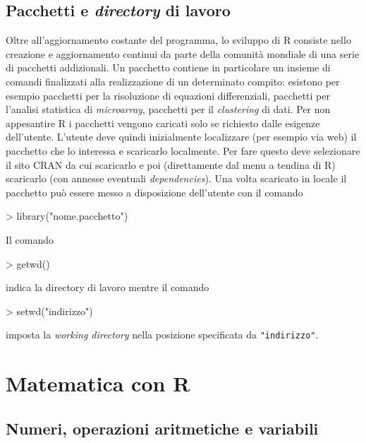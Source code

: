\documentclass[onecolumn,11pt]{book}
\begin{document}
\section*{Pacchetti e \emph{directory} di lavoro}
Oltre all'aggiornamento costante del programma, lo sviluppo di \textsf{R} consiste nello creazione e aggiornamento continui da parte della comunit\`a  mondiale di una serie di pacchetti addizionali. Un pacchetto contiene in particolare un insieme di comandi finalizzati alla  realizzazione di un determinato compito: esistono per esempio pacchetti per la risoluzione di equazioni differenziali, pacchetti per l'analisi statistica di {\it microarray}, pacchetti per il {\it clustering} di dati.  Per non appesantire \textsf{R} i pacchetti vengono caricati solo se richiesto dalle esigenze dell'utente. 
L'utente deve quindi inizialmente localizzare (per esempio via web) il pacchetto che lo interessa e scaricarlo localmente.  Per fare questo deve selezionare il sito CRAN da cui scaricarlo e poi (direttamente dal menu a tendina di \textsf{R}) scaricarlo (con annesse eventuali {\it dependencies}). Una volta scaricato in locale il pacchetto pu\`o essere messo a disposizione dell'utente con il comando  
\begin{Schunk}
\begin{Sinput}
> library("nome.pacchetto")
\end{Sinput}
\end{Schunk}
Il comando  
\begin{Schunk}
\begin{Sinput}
> getwd()
\end{Sinput}
\end{Schunk}
indica la directory di lavoro mentre il comando 
\begin{Schunk}
\begin{Sinput}
> setwd("indirizzo")
\end{Sinput}
\end{Schunk}
 imposta la {\it working directory}  nella posizione specificata da \texttt{"indirizzo"}.
\newpage
\thispagestyle{empty}
 \chapter{Matematica con \textsf{R}} 
\section{Numeri, operazioni aritmetiche e variabili}
\end{document}
